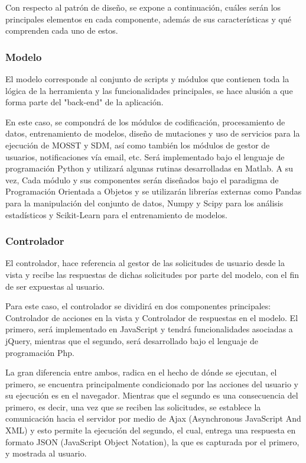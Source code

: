 Con respecto al patrón de diseño, se  expone  a continuación, cuáles serán los principales elementos en cada componente, además de sus características y qué comprenden cada uno de estos.

\subsubsection{Modelo}

El modelo corresponde al conjunto de scripts y módulos que contienen toda la lógica de la herramienta y las funcionalidades principales, se hace alusión a que forma parte del "back-end" de la aplicación. 

En este caso, se compondrá de los módulos de codificación, procesamiento de datos, entrenamiento de modelos, diseño de mutaciones y uso de servicios para la ejecución de MOSST y SDM, así como también los módulos de gestor de usuarios, notificaciones vía email, etc. Será implementado bajo el lenguaje de programación Python y utilizará algunas rutinas desarrolladas en Matlab. A su vez, Cada módulo y sus componentes serán diseñados bajo el paradigma de Programación Orientada a Objetos y se utilizarán librerías externas como Pandas \cite{mckinney2010data} para la manipulación del conjunto de datos, Numpy \cite{van2011numpy} y Scipy \cite{oliphant2007python} para los análisis estadísticos y Scikit-Learn \cite{pedregosa2011scikit} para el entrenamiento de modelos.

\subsubsection{Controlador}

El controlador, hace referencia al gestor de las solicitudes de usuario desde la vista y recibe las respuestas de dichas solicitudes por parte del modelo, con el fin de ser expuestas al usuario. 

Para este caso, el controlador se dividirá en dos componentes principales: Controlador de acciones en la vista y Controlador de respuestas en el modelo. El primero, será implementado en JavaScript y tendrá funcionalidades asociadas a jQuery, mientras que el segundo, será desarrollado bajo el lenguaje de programación Php. 

La gran diferencia entre ambos, radica en el hecho de dónde se ejecutan, el primero, se encuentra principalmente condicionado por las acciones del usuario y su ejecución es en el navegador. Mientras que el segundo es una consecuencia del primero, es decir, una vez que se reciben las solicitudes, se establece la comunicación hacia el servidor por medio de Ajax (Asynchronous JavaScript And XML) y esto permite la ejecución del segundo, el cual, entrega una respuesta en formato JSON (JavaScript Object Notation), la que es capturada por el primero, y mostrada al usuario.

